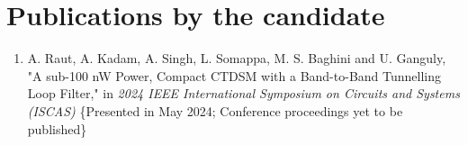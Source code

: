 \section*{Publications by the candidate}
\begin{enumerate}
    \item A. Raut, A. Kadam, A. Singh, L. Somappa, M. S. Baghini and U. Ganguly, "A sub-100 nW Power, Compact CTDSM with a Band-to-Band Tunnelling Loop Filter," in \textit{2024 IEEE International Symposium on Circuits and Systems (ISCAS)} \{Presented in May 2024; Conference proceedings yet to be published\}
\end{enumerate}